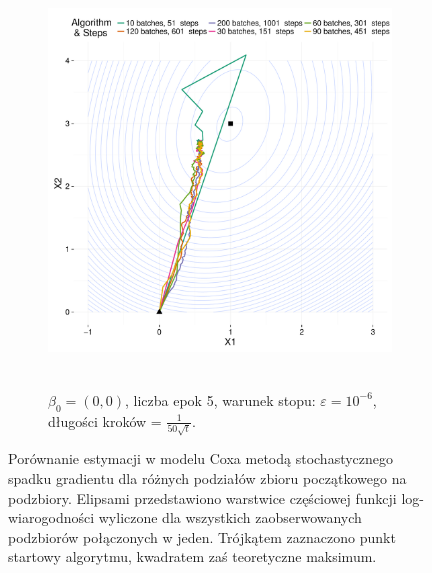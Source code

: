 \begin{figure}[hbt!]
\begin{center}
\begin{subfigure}[h!]{0.9\textwidth}
      \includegraphics[width=\textwidth, height=310pt]{Obrazki/b_0_0_iter_5_e-6_50sqrt.pdf}
            \caption{$\beta_0=(0,0)$, liczba epok 5, warunek stopu: $\varepsilon=10^{-6}$, długości kroków = $\frac{1}{50\sqrt{t}}$.}
   \end{subfigure}  
      \end{center}
  \caption[Porównanie estymacji w modelu Coxa metodą stochastycznego spadku gradientu dla różnych podziałów zbioru początkowego na podzbiory.]{\label{rysCox}Porównanie estymacji w modelu Coxa metodą stochastycznego spadku gradientu dla różnych podziałów zbioru początkowego na podzbiory. Elipsami przedstawiono warstwice częściowej funkcji log-wiarogodności wyliczone dla wszystkich zaobserwowanych podzbiorów połączonych w jeden. Trójkątem zaznaczono punkt startowy algorytmu, kwadratem zaś teoretyczne maksimum.}
\end{figure}



